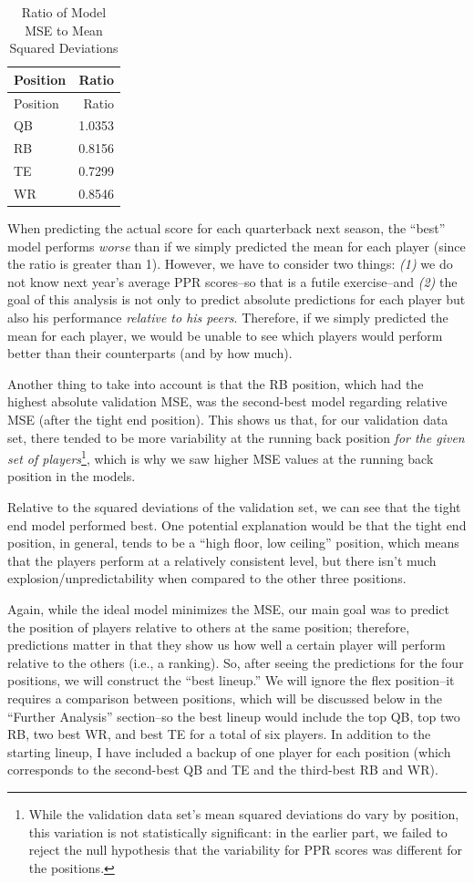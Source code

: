 \documentclass[
]{article}
\begin{document}
\begin{longtable}[]{@{}lr@{}}
\caption{Ratio of Model MSE to Mean Squared Deviations}\tabularnewline
\toprule
Position & Ratio \\
\midrule
\endfirsthead
\toprule
Position & Ratio \\
\midrule
\endhead
QB & 1.0353 \\
RB & 0.8156 \\
TE & 0.7299 \\
WR & 0.8546 \\
\bottomrule
\end{longtable}

When predicting the actual score for each quarterback next season, the
``best'' model performs \emph{worse} than if we simply predicted the
mean for each player (since the ratio is greater than 1). However, we
have to consider two things: \emph{(1)} we do not know next year's
average PPR scores--so that is a futile exercise--and \emph{(2)} the
goal of this analysis is not only to predict absolute predictions for
each player but also his performance \emph{relative to his peers}.
Therefore, if we simply predicted the mean for each player, we would be
unable to see which players would perform better than their counterparts
(and by how much).

Another thing to take into account is that the RB position, which had
the highest absolute validation MSE, was the second-best model regarding
relative MSE (after the tight end position). This shows us that, for our
validation data set, there tended to be more variability at the running
back position \emph{for the given set of players}\footnote{While the
  validation data set's mean squared deviations do vary by position,
  this variation is not statistically significant: in the earlier part,
  we failed to reject the null hypothesis that the variability for PPR
  scores was different for the positions.}, which is why we saw higher
MSE values at the running back position in the models.

Relative to the squared deviations of the validation set, we can see
that the tight end model performed best. One potential explanation would
be that the tight end position, in general, tends to be a ``high floor,
low ceiling'' position, which means that the players perform at a
relatively consistent level, but there isn't much
explosion/unpredictability when compared to the other three positions.

Again, while the ideal model minimizes the MSE, our main goal was to
predict the position of players relative to others at the same position;
therefore, predictions matter in that they show us how well a certain
player will perform relative to the others (i.e., a ranking). So, after
seeing the predictions for the four positions, we will construct the
``best lineup.'' We will ignore the flex position--it requires a
comparison between positions, which will be discussed below in the
``Further Analysis'' section--so the best lineup would include the top
QB, top two RB, two best WR, and best TE for a total of six players. In
addition to the starting lineup, I have included a backup of one player
for each position (which corresponds to the second-best QB and TE and
the third-best RB and WR).
\end{document}
